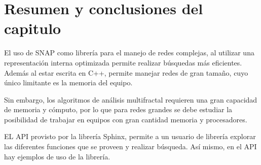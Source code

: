\section{Resumen y conclusiones del capitulo}

El uso de SNAP como librería para el manejo de redes complejas, al utilizar una representación interna optimizada permite realizar búsquedas más eficientes. Además al estar escrita en C++, permite manejar redes de gran tamaño, cuyo único limitante es la memoria del equipo.

Sin embargo, los algoritmos de análisis multifractal requieren una gran capacidad de memoria y cómputo, por lo que para redes grandes se debe estudiar la posibilidad de trabajar en equipos con gran cantidad memoria y procesadores.

EL API provisto por la librería Sphinx, permite a un usuario de librería explorar las diferentes funciones que se proveen y realizar búsqueda. Así mismo, en el API hay ejemplos de uso de la librería.